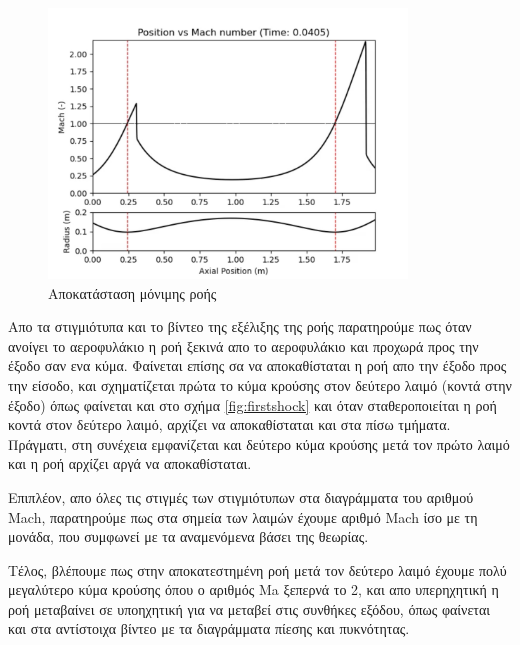 \begin{figure}[h!]
    \begin{center}
        \includegraphics[width=0.85\textwidth]{figures/steady.png}
    \end{center}
    \caption{Αποκατάσταση μόνιμης ροής}
    \label{fig:steady}
\end{figure}


Απο τα στιγμιότυπα και το βίντεο της εξέλιξης της ροής παρατηρούμε πως όταν ανοίγει το αεροφυλάκιο η ροή ξεκινά απο το αεροφυλάκιο και προχωρά προς την έξοδο σαν ενα κύμα. Φαίνεται επίσης σα να αποκαθίσταται η ροή απο την έξοδο προς την είσοδο, και σχηματίζεται πρώτα το κύμα κρούσης στον δεύτερο λαιμό (κοντά στην έξοδο) όπως φαίνεται και στο σχήμα \ref{fig:firstshock} και όταν σταθεροποιείται η ροή κοντά στον δεύτερο λαιμό, αρχίζει να αποκαθίσταται και στα πίσω τμήματα. Πράγματι, στη συνέχεια εμφανίζεται και δεύτερο κύμα κρούσης μετά τον πρώτο λαιμό και η ροή αρχίζει αργά να αποκαθίσταται. 

Επιπλέον, απο όλες τις στιγμές των στιγμιότυπων στα διαγράμματα του αριθμού Mach, παρατηρούμε πως στα σημεία των λαιμών έχουμε αριθμό Mach ίσο με τη μονάδα, που συμφωνεί με τα αναμενόμενα βάσει της θεωρίας.

Τέλος, βλέπουμε πως στην αποκατεστημένη ροή μετά τον δεύτερο λαιμό έχουμε πολύ μεγαλύτερο κύμα κρούσης όπου ο αριθμός Ma ξεπερνά το 2, και απο υπερηχητική η ροή μεταβαίνει σε υποηχητική για να μεταβεί στις συνθήκες εξόδου, όπως φαίνεται και στα αντίστοιχα βίντεο με τα διαγράμματα πίεσης και πυκνότητας.

